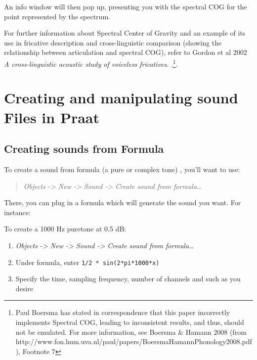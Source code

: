 \documentclass[11pt]{article}
\def\tightlist{}
\begin{document}
An info window will then pop up, presenting you with the spectral COG
for the point represented by the spectrum.

For further information about Spectral Center of Gravity and an example
of its use in fricative description and cross-linguistic comparison
(showing the relationship between articulation and spectral COG), refer
to Gordon et al 2002 \emph{A cross-linguistic acoustic study of
voiceless fricatives}.
\cite{Gordon:2002vv}.\footnote{Paul Boersma has stated in correspondence that this paper incorrectly implements Spectral COG, leading to inconsistent results, and thus, should not be emulated.  For more information, see Boersma \& Hamann 2008 (from http://www.fon.hum.uva.nl/paul/papers/BoersmaHamannPhonology2008.pdf), Footnote 7}.

\hypertarget{creating-and-manipulating-sound-files-in-praat}{%
\section{Creating and manipulating sound Files in
Praat}\label{creating-and-manipulating-sound-files-in-praat}}

\hypertarget{creating-sounds-from-formula}{%
\subsection{Creating sounds from
Formula}\label{creating-sounds-from-formula}}

\label{creatingsounds}

To create a sound from formula (a pure or complex tone) , you'll want to
use:

\begin{quote}
\emph{Objects -\textgreater{} New -\textgreater{} Sound -\textgreater{}
Create sound from formula\ldots{}}
\end{quote}

There, you can plug in a formula which will generate the sound you want.
For instance:

To create a 1000 Hz puretone at 0.5 dB:

\begin{enumerate}
\def\labelenumi{\arabic{enumi}.}
\tightlist
\item
  \emph{Objects -\textgreater{} New -\textgreater{} Sound
  -\textgreater{} Create sound from formula\ldots{}}
\item
  Under formula, enter \texttt{1/2 * sin(2*pi*1000*x)}
\item
  Specify the time, sampling frequency, number of channels and such as
  you desire
\end{enumerate}
\end{document}

